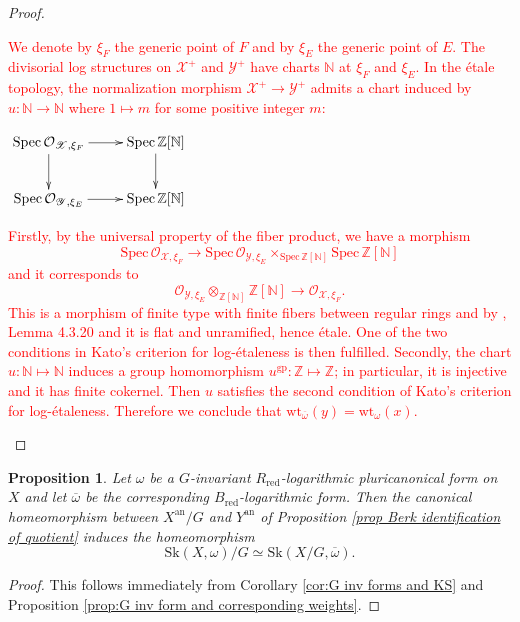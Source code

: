 \documentclass{amsart}%
\numberwithin{equation}{subsection}
\theoremstyle{plain2}
\newtheorem{prop}[equation]{Proposition}
\theoremstyle{definition2}
\theoremstyle{stepstyle}
\theoremstyle{point}
\theoremstyle{subpoint}
\newcommand{\N}{\ensuremath{\mathbb{N}}}
\newcommand{\Z}{\ensuremath{\mathbb{Z}}}
\newcommand{\cX}{\ensuremath{\mathscr{X}}}
\newcommand{\caO}{\ensuremath{\mathcal{O}}}
\newcommand{\cY}{\ensuremath{\mathscr{Y}}}
\renewcommand{\cY}{\ensuremath{\mathscr{Y}}}
\newcommand{\Spec}{\ensuremath{\mathrm{Spec}\,}}
\newcommand{\redu}{\mathrm{red}}
\newcommand{\an}{\mathrm{an}}
\newcommand{\weight}{\mathrm{wt}}
\newcommand{\Sk}{\mathrm{Sk}}
\begin{document}
\begin{proof}
\textcolor{red}{We denote by $\xi_{F}$ the generic point of $F$ and by $\xi_E$ the generic point of $E$. The divisorial log structures on $\cX^+$ and $\cY^+$ have charts $\N$ at $\xi_{F}$ and $\xi_E$. In the \'{e}tale topology, the normalization morphism $\cX^+ \rightarrow \cY^+$ admits a chart induced by $u:\N \rightarrow \N$ where $1 \mapsto m$ for some positive integer $m$:
\begin{center}
$\xymatrix{
\Spec \caO_{\cX, \xi_{F}} \ar[d] \ar[r] & \Spec \Z[\N] \ar[d] \\
\Spec \caO_{\cY, \xi_{E}}  \ar[r] & \Spec \Z[\N] 
}$
\end{center} Firstly, by the universal property of the fiber product, we have a morphism $$\Spec \caO_{\cX, \xi_{F}} \rightarrow \Spec \caO_{\cY, \xi_{E}} \times_{\Spec \Z[\N] } \Spec \Z[\N]$$ and it corresponds to $$ \caO_{\cY, \xi_{E}}  \otimes_{\Z[\N]} \Z[\N] \rightarrow\caO_{\cX, \xi_{F}}.$$ This is a morphism of finite type with finite fibers between regular rings and by \cite{Liu2002}, Lemma 4.3.20 and \cite{Nowak} it is flat and unramified, hence \'{e}tale. One of the two conditions in Kato's criterion for log-\'{e}taleness is then fulfilled. Secondly, the chart $u:\N \mapsto \N$ induces a group homomorphism $u^{\text{gp}}: \Z \mapsto \Z$; in particular, it is injective and it has finite cokernel. Then $u$ satisfies the second condition of Kato's criterion for log-\'{e}taleness. Therefore we conclude that $\weight_{\overline{\omega}}(y)=\weight_\omega(x)$.}
\end{proof}

\begin{prop} \label{prop:G inv and homeo KS of quotient}
Let $\omega$ be a $G$-invariant $R_\redu$-logarithmic pluricanonical form on $X$ and let $\overline{\omega}$ be the corresponding $B_\redu$-logarithmic form. Then the canonical homeomorphism between $X^\an/G$ and $Y^\an$ of Proposition \ref{prop Berk identification of quotient} induces the homeomorphism $$\Sk(X,\omega)/G \simeq \Sk(X/G,\overline{\omega}).$$
\end{prop}
\begin{proof}
This follows immediately from Corollary \ref{cor:G inv forms and KS} and Proposition \ref{prop:G inv form and corresponding weights}.
\end{proof}
\end{document}
